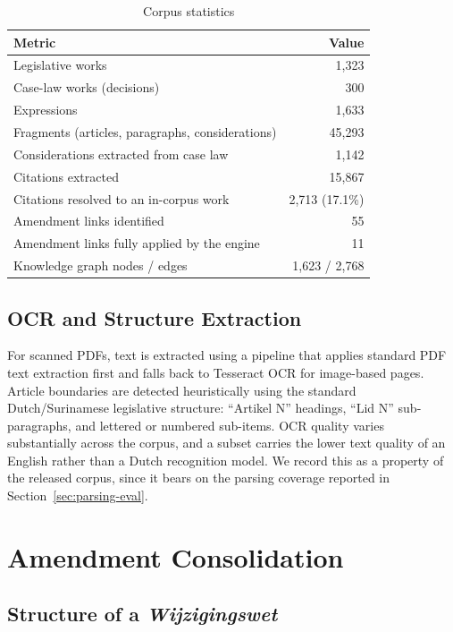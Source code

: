\documentclass{IOS-Book-Article}
\begin{document}
\begin{table}[h]
\caption{Corpus statistics}
\label{tab:stats}
\begin{tabular}{|l|r|}
\hline
\textbf{Metric} & \textbf{Value} \\
\hline
Legislative works & 1,323 \\
Case-law works (decisions) & 300 \\
Expressions & 1,633 \\
Fragments (articles, paragraphs, considerations) & 45,293 \\
Considerations extracted from case law & 1,142 \\
Citations extracted & 15,867 \\
Citations resolved to an in-corpus work & 2,713 (17.1\%) \\
Amendment links identified & 55 \\
Amendment links fully applied by the engine & 11 \\
Knowledge graph nodes / edges & 1,623 / 2,768 \\
\hline
\end{tabular}
\end{table}

\subsection{OCR and Structure Extraction}

For scanned PDFs, text is extracted using a pipeline that applies standard PDF text
extraction first and falls back to Tesseract OCR for image-based pages. Article boundaries
are detected heuristically using the standard Dutch/Surinamese legislative structure:
``Artikel N'' headings, ``Lid N'' sub-paragraphs, and lettered or numbered sub-items. OCR quality
varies substantially across the corpus, and a subset carries the lower text quality of an
English rather than a Dutch recognition model. We record this as a property of the released
corpus, since it bears on the parsing coverage reported in Section~\ref{sec:parsing-eval}.

\section{Amendment Consolidation}
\label{sec:consolidation}

\subsection{Structure of a \emph{Wijzigingswet}}
\end{document}
